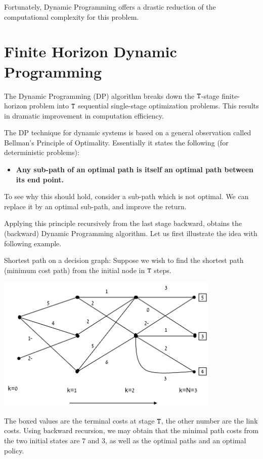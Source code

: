 Fortunately, Dynamic Programming offers a drastic reduction of the
computational complexity for this problem.

\section{Finite Horizon Dynamic Programming}

The Dynamic Programming (DP) algorithm breaks down the
${\tt T}$-stage finite-horizon problem into ${\tt T}$ sequential
single-stage optimization problems. This results in dramatic
improvement in computation efficiency.

The DP technique for dynamic systems is based on a general
observation called Bellman's Principle of Optimality. Essentially it
states the following (for deterministic problems):
\begin{itemize}
  \item \textbf{Any sub-path of an optimal path is itself an optimal path between its end point.}
\end{itemize}
To see why this should hold, consider a sub-path which is not
optimal. We can replace it by an optimal sub-path, and improve the
return.

Applying this principle recursively from the last stage backward,
obtains the (backward) Dynamic Programming algorithm. Let us first
illustrate the idea with following example.

\begin{example}
Shortest path on a decision graph:  Suppose we wish to find the
shortest path (minimum cost path) from the initial node in
${\tt T}$ steps.

\begin{centering}
\includegraphics[width=0.8\textwidth]{figures/lecture2_DP}
\end{centering}

\medskip
The boxed values are the terminal costs at stage ${\tt T}$, the
other number are the link costs. Using backward recursion, we may
obtain that the minimal path costs from the two initial states are
$7$ and $3$, as well as the optimal paths and an optimal policy.
\end{example}

